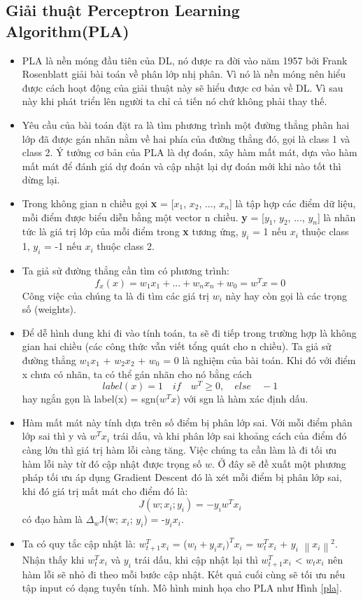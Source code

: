\subsection{Giải thuật Perceptron Learning Algorithm(PLA)}
\begin{itemize}
\item PLA là nền móng đầu tiên của DL, nó được ra đời vào năm 1957 bởi Frank Rosenblatt giải bài toán về phân lớp nhị phân. Vì nó là nền móng nên hiểu được cách hoạt động của giải thuật này sẽ hiểu được cơ bản về DL. Vì sau này khi phát triển lên người ta chỉ cả tiến nó chứ không phải thay thế.
\item Yêu cầu của bài toán đặt ra là tìm phương trình một đường thẳng phân hai lớp đã được gán nhãn nằm về hai phía của đường thẳng đó, gọi là class 1 và class 2. Ý tưởng cơ bản của PLA là dự đoán, xây hàm mất mát, dựa vào hàm mất mát để đánh giá dự đoán và cập nhật lại dự đoán mới khi nào tốt thì dừng lại.
\item Trong không gian n chiều gọi \textbf{x} = [$x_{1}$, $x_{2}$, ..., $x_{n}$] là tập hợp các điểm dữ liệu, mỗi điểm được biểu diễn bằng một vector n chiều. \textbf{y} = [$y_{1}$, $y_{2}$, ..., $y_{n}$] là nhãn tức là giá trị lớp của mỗi điểm trong \textbf{x} tương ứng, $y_{i}$ = 1 nếu $x_{i}$ thuộc class 1, $y_{i}$ = -1 nếu $x_{i}$ thuộc class 2.
\item Ta giả sử đường thẳng cần tìm có phương trình:\[f_{x}(x) = w_{1}x_{1}+...+w_{n}x_{n}+w_{0}=w^{T}x = 0\]
Công việc của chúng ta là đi tìm các giá trị $w_{i}$ này hay còn gọi là các trọng số (weights).
\item Để dễ hình dung khi đi vào tính toán, ta sẽ đi tiếp trong trường hợp là không gian hai chiều (các công thức vẫn viết tổng quát cho n chiều). Ta giả sử đường thẳng $w_{1}$$x_{1}$ + $w_{2}$$x_{2}$ + $w_{0}$ = 0 là nghiệm của bài toán. Khi đó với điểm x chưa có nhãn, ta có thể gán nhãn cho nó bằng cách  \[label(x) = 1 \quad if \quad w^T \geq 0, \quad else \quad -1\] hay ngắn gọn là label(x) = sgn($w^{T}x$) với sgn là hàm xác định dấu.
\item Hàm mất mát này tính dựa trên số điểm bị phân lớp sai. Với mỗi điểm phân lớp sai thì y và $w^{T}$$x_{i}$ trái dấu, và khi phân lớp sai khoảng cách của điểm đó càng lớn thì giá trị hàm lỗi càng tăng. Việc chúng ta cần làm là đi tối ưu hàm lỗi này từ đó cập nhật được trọng số $w$. Ở đây sẽ đề xuất một phương pháp tối ưu áp dụng Gradient Descent đó là xét mỗi điểm bị phân lớp sai, khi đó giá trị mất mát cho điểm đó là: \[J(w; x_i; y_i) = -y_i w^T x_i\] có đạo hàm là $\Delta _{w}$J(w; $x_{i}$; $y_{i}$) = -$y_{i}$$x_{i}$.
\item Ta có quy tắc cập nhật là: $w_{t+1}^{T}$$x_{i}$ = ($w_{t}+y_{i} x_{i} )^{T}$$x_{i}$ =  $w_{t}^{T}$$x_{i}$ + $y_{i}$ $\left \| x_i \right \| ^{2}$.
Nhận thấy khi $w_{t}^T$$x_{i}$ và $y_{i}$ trái dấu, khi cập nhật lại thì $w_{t+1}^Tx_{i}$ < $w_{t}x_{i}$ nên hàm lỗi sẽ nhỏ đi theo mỗi bước cập nhật. Kết quả cuối cùng sẽ tối ưu nếu tập input có dạng tuyến tính. Mô hình minh họa cho PLA như Hình \ref{pla}. 
\end{itemize}

